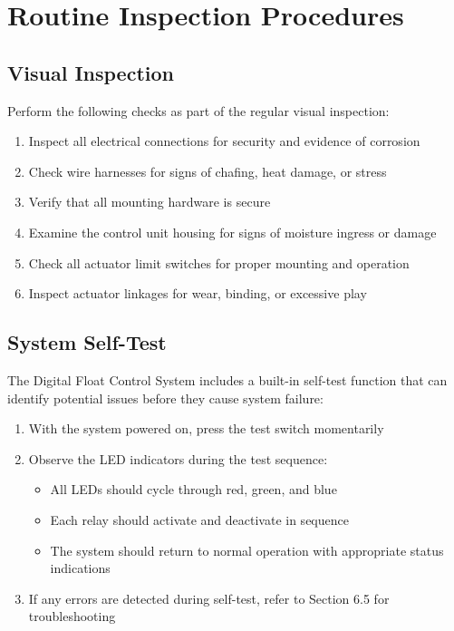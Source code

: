 \documentclass[12pt,a4paper,twoside,openright]{book}
\begin{document}
\section{Routine Inspection Procedures}

\subsection{Visual Inspection}

Perform the following checks as part of the regular visual inspection:

\begin{enumerate}
    \item Inspect all electrical connections for security and evidence of corrosion
    \item Check wire harnesses for signs of chafing, heat damage, or stress
    \item Verify that all mounting hardware is secure 
    \item Examine the control unit housing for signs of moisture ingress or damage
    \item Check all actuator limit switches for proper mounting and operation
    \item Inspect actuator linkages for wear, binding, or excessive play
\end{enumerate}

\subsection{System Self-Test}

The Digital Float Control System includes a built-in self-test function that can identify potential issues before they cause system failure:

\begin{enumerate}
    \item With the system powered on, press the test switch momentarily
    \item Observe the LED indicators during the test sequence:
    \begin{itemize}
        \item All LEDs should cycle through red, green, and blue
        \item Each relay should activate and deactivate in sequence
        \item The system should return to normal operation with appropriate status indications
    \end{itemize}
    \item If any errors are detected during self-test, refer to Section 6.5 for troubleshooting
\end{enumerate}
\end{document}
